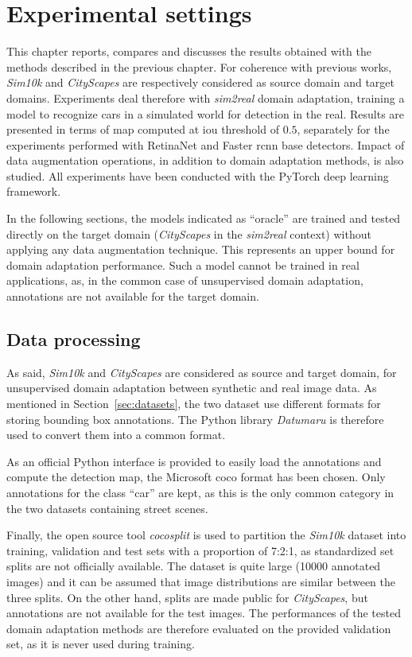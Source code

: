 \documentclass[%
    corpo=12pt,
    twoside,
    stile=classica,   
    tipotesi=magistrale,
    evenboxes,
    english,
	numerazioneromana,
]{toptesi}
\newcommand{\quotes}[1]{``#1''}
\begin{document}
\section{Experimental settings}
This chapter reports, compares and discusses the results obtained with the methods described in the previous chapter. For coherence with previous works, \textit{Sim10k} and \textit{CityScapes} are respectively considered as source domain and target domains. Experiments deal therefore with \textit{sim2real} domain adaptation, training a model to recognize cars in a simulated world for detection in the real. Results are presented in terms of \gls{map} computed at \gls{iou} threshold of $ 0.5 $, separately for the experiments performed with RetinaNet and Faster \gls{rcnn} base detectors. Impact of data augmentation operations, in addition to domain adaptation methods, is also studied. All experiments have been conducted with the PyTorch deep learning framework.

\bigskip
In the following sections, the models indicated as \quotes{oracle} are trained and tested directly on the target domain (\textit{CityScapes} in the \textit{sim2real} context) without applying any data augmentation technique. This represents an upper bound for domain adaptation performance. Such a model cannot be trained in real applications, as, in the common case of unsupervised domain adaptation, annotations are not available for the target domain.

\subsection{Data processing}
As said, \textit{Sim10k} and \textit{CityScapes} are considered as source and target domain, for unsupervised domain adaptation between synthetic and real image data. As mentioned in Section~\ref{sec:datasets}, the two dataset use different formats for storing bounding box annotations. The Python library \textit{Datumaru}\cite{datumaro} is therefore used to convert them into a common format.

\medskip
As an official Python interface is provided to easily load the annotations and compute the detection \gls{map}, the Microsoft \gls{coco} format has been chosen. Only annotations for the class \quotes{car} are kept, as this is the only common category in the two datasets containing street scenes.

\medskip
Finally, the open source tool \textit{cocosplit}\cite{cocosplit} is used to partition the \textit{Sim10k} dataset into training, validation and test sets with a proportion of 7\string:2\string:1, as standardized set splits are not officially available. The dataset is quite large (10000 annotated images) and it can be assumed that image distributions are similar between the three splits. On the other hand, splits are made public for \textit{CityScapes}, but annotations are not available for the test images. The performances of the tested domain adaptation methods are therefore evaluated on the provided validation set, as it is never used during training.
\end{document}

